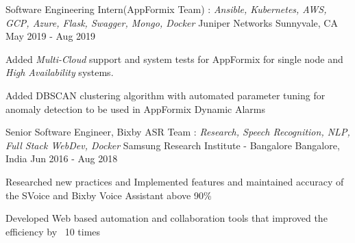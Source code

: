

\begin{cventries}

    \cventry
      {Software Engineering Intern(AppFormix Team) : \textit{Ansible, Kubernetes, AWS, GCP, Azure, Flask, Swagger, Mongo, Docker}} %
      {Juniper Networks} %
      {Sunnyvale, CA} %
      {May 2019 - Aug 2019} %
      {
        \begin{cvitems}
        \item{Added \textit{Multi-Cloud} support and system tests for AppFormix for single node and \textit{High Availability} systems.}
        \item{Added DBSCAN clustering algorithm with automated parameter tuning for anomaly detection to be used in AppFormix Dynamic Alarms}
        \end{cvitems}
      }

  \cventry
    {Senior Software Engineer, Bixby ASR Team : \textit{Research, Speech Recognition, NLP, Full Stack WebDev, Docker}} %
    {Samsung Research Institute - Bangalore} %
    {Bangalore, India} %
    {Jun 2016 - Aug 2018} %
    {
      \begin{cvitems}
      \item{Researched new practices and Implemented features and maintained accuracy of the SVoice and Bixby Voice Assistant above 90\%}
      \item{Developed Web based automation and collaboration tools that improved the efficiency by ~10 times}
      \end{cvitems}
    }


\end{cventries}
